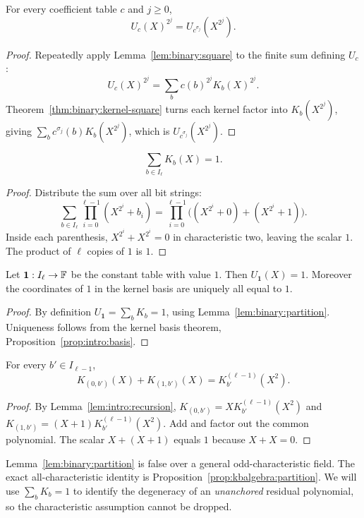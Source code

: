 \begin{theorem}\label{thm:binary:encoding-frob}
For every coefficient table $c$ and $j\geq0$,
\[
 \boxed{U_c(X)^{2^j}=U_{c^{\sigma_j}}(X^{2^j}).}
\]
\end{theorem}
\begin{proof}
Repeatedly apply Lemma~\ref{lem:binary:square} to the finite sum
defining $U_c$:
\[
 U_c(X)^{2^j}
 =\sum_b c(b)^{2^j}K_b(X)^{2^j}.
\]
Theorem~\ref{thm:binary:kernel-square} turns each kernel factor
into $K_b(X^{2^j})$, giving
$\sum_b c^{\sigma_j}(b)K_b(X^{2^j})$,
which is $U_{c^{\sigma_j}}(X^{2^j})$.
\end{proof}

\begin{lemma}\label{lem:binary:partition}
\[
 \boxed{\sum_{b\in I_\ell}K_b(X)=1.}
\]
\end{lemma}
\begin{proof}
Distribute the sum over all bit strings:
\[
 \sum_{b\in I_\ell}\prod_{i=0}^{\ell-1}(X^{2^i}+b_i)
 =\prod_{i=0}^{\ell-1}
    \bigl((X^{2^i}+0)+(X^{2^i}+1)\bigr).
\]
Inside each parenthesis, $X^{2^i}+X^{2^i}=0$ in
characteristic two, leaving the scalar $1$. The product of
$\ell$ copies of $1$ is $1$.
\end{proof}

\begin{corollary}\label{cor:binary:one-coeffs}
Let $\mathbf1:I_\ell\to\mathbb{F}$ be the constant table with value $1$.
Then $U_{\mathbf1}(X)=1$. Moreover the coordinates of $1$
in the kernel basis are uniquely all equal to $1$.
\end{corollary}
\begin{proof}
By definition $U_{\mathbf1}=\sum_bK_b=1$,
using Lemma~\ref{lem:binary:partition}. Uniqueness follows
from the kernel basis theorem, Proposition~\ref{prop:intro:basis}.
\end{proof}

\begin{lemma}\label{lem:binary:complementary}
For every $b'\in I_{\ell-1}$,
\[
 K_{(0,b')}(X)+K_{(1,b')}(X)=K_{b'}^{(\ell-1)}(X^2).
\]
\end{lemma}
\begin{proof}
By Lemma~\ref{lem:intro:recursion},
$K_{(0,b')}=XK_{b'}^{(\ell-1)}(X^2)$ and
$K_{(1,b')}=(X+1)K_{b'}^{(\ell-1)}(X^2)$.
Add and factor out the common polynomial. The scalar
$X+(X+1)$ equals $1$ because $X+X=0$.
\end{proof}

\begin{remark}
Lemma~\ref{lem:binary:partition} is false over a general
odd-characteristic field. The exact all-characteristic identity
is Proposition~\ref{prop:kbalgebra:partition}. We will use
$\sum_bK_b=1$ to identify the degeneracy of an \emph{unanchored}
residual polynomial, so the characteristic assumption cannot
be dropped.
\end{remark}
